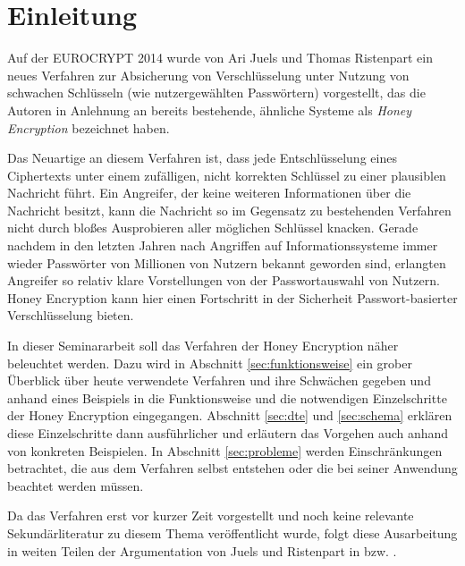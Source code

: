 \section{Einleitung}

Auf der EUROCRYPT 2014 wurde von Ari Juels und Thomas Ristenpart ein neues Verfahren zur Absicherung von Verschlüsselung unter Nutzung von schwachen Schlüsseln (wie nutzergewählten Passwörtern) vorgestellt, das die Autoren in Anlehnung an bereits bestehende, ähnliche Systeme als \emph{Honey Encryption} bezeichnet haben. 

Das Neuartige an diesem Verfahren ist, dass jede Entschlüsselung eines Ciphertexts unter einem zufälligen, nicht korrekten Schlüssel zu einer plausiblen Nachricht führt. Ein Angreifer, der keine weiteren Informationen über die Nachricht besitzt, kann die Nachricht so im Gegensatz zu bestehenden Verfahren nicht durch bloßes Ausprobieren aller möglichen Schlüssel knacken. Gerade nachdem in den letzten Jahren nach Angriffen auf Informationssysteme immer wieder Passwörter von Millionen von Nutzern bekannt geworden sind, erlangten  Angreifer so relativ klare Vorstellungen von der Passwortauswahl von Nutzern. Honey Encryption kann hier einen Fortschritt in der Sicherheit Passwort-basierter Verschlüsselung bieten.

In dieser Seminararbeit soll das Verfahren der Honey Encryption näher beleuchtet werden. Dazu wird in Abschnitt \ref{sec:funktionsweise} ein grober Überblick über heute verwendete Verfahren und ihre Schwächen gegeben und anhand eines Beispiels in die Funktionsweise und die notwendigen Einzelschritte der Honey Encryption eingegangen. Abschnitt \ref{sec:dte} und \ref{sec:schema} erklären diese Einzelschritte dann ausführlicher und erläutern das Vorgehen auch anhand von konkreten Beispielen. In Abschnitt \ref{sec:probleme} werden Einschränkungen betrachtet, die aus dem Verfahren selbst entstehen oder die bei seiner Anwendung beachtet werden müssen.

Da das Verfahren erst vor kurzer Zeit vorgestellt und noch keine relevante Sekundärliteratur zu diesem Thema veröffentlicht wurde, folgt diese Ausarbeitung in weiten Teilen der Argumentation von Juels und Ristenpart in \cite{IEEE2014} bzw. \cite{EURO2014}.
